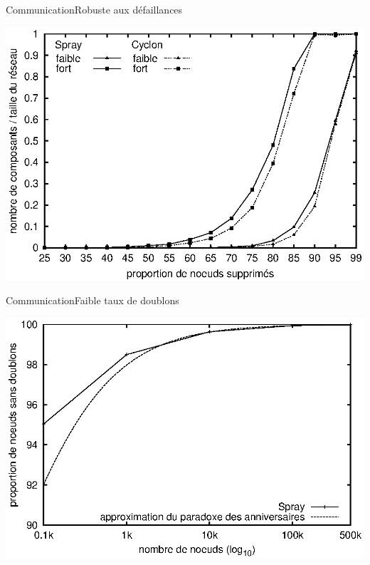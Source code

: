 \begin{frame}{Communication}{Robuste aux défaillances}
  \begin{center}
    \includegraphics[width=1\textwidth]{img/network/resilience.eps}
  \end{center}
\end{frame}


\begin{frame}{Communication}{Faible taux de doublons}
  \begin{center}
    \includegraphics[width=1\textwidth]{img/network/duplicates.eps}
  \end{center}
\end{frame}


